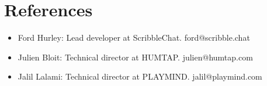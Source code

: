 \documentclass[10pt,a4paper,sans]{moderncv}        %
\begin{document}
\section{References}
\begin{cvcolumns}
  \cvcolumn{}
  {\begin{itemize}
  \item Ford Hurley: Lead developer at ScribbleChat. ford@scribble.chat
  \item Julien Bloit: Technical director at HUMTAP. julien@humtap.com
  \item Jalil Lalami: Technical director at PLAYMIND. jalil@playmind.com
  \end{itemize}}
\end{cvcolumns}

% 


\end{document}
